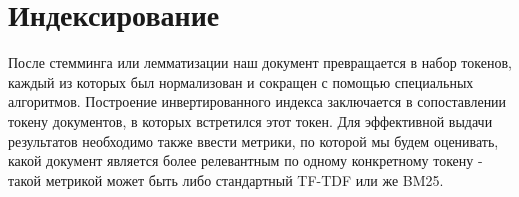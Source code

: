 \section{Индексирование}
После стемминга или лемматизации наш документ превращается в набор токенов, каждый из которых был 
нормализован и сокращен с помощью специальных алгоритмов. Построение инвертированного индекса заключается 
в сопоставлении токену документов, в которых встретился этот токен. Для эффективной выдачи результатов 
необходимо также ввести метрики, по которой мы будем оценивать, какой документ является более релевантным 
по одному конкретному токену - такой метрикой может быть либо стандартный TF-TDF или же BM25. 